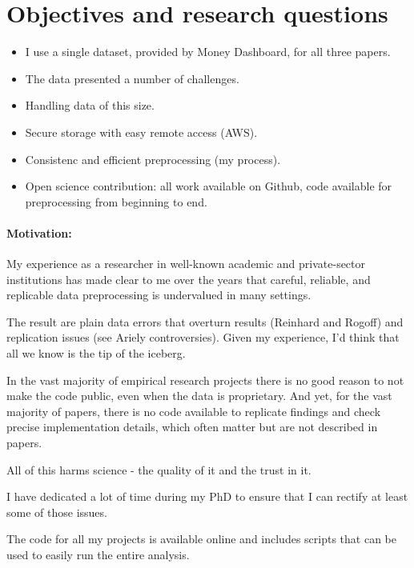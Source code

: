 
\section{Objectives and research questions}%
\label{sec:objectives}


\begin{itemize}
    \item I use a single dataset, provided by Money Dashboard, for all three
        papers.

    \item The data presented a number of challenges.

    \item Handling data of this size.

    \item Secure storage with easy remote access (AWS).

    \item Consistenc and efficient preprocessing (my process).

    \item Open science contribution: all work available on Github, code
        available for preprocessing from beginning to end.
\end{itemize}

\paragraph{Motivation:}%
\label{par:motivation_}

My experience as a researcher in well-known academic and private-sector
institutions has made clear to me over the years that careful, reliable, and
replicable data preprocessing is undervalued in many settings.

The result are plain data errors that overturn results (Reinhard and Rogoff)
and replication issues (see Ariely controversies). Given my experience, I'd
think that all we know is the tip of the iceberg.

In the vast majority of empirical research projects there is no good reason to
not make the code public, even when the data is proprietary. And yet, for the
vast majority of papers, there is no code available to replicate findings and
check precise implementation details, which often matter but are not described
in papers.

All of this harms science - the quality of it and the trust in it.

I have dedicated a lot of time during my PhD to ensure that I can rectify at
least some of those issues.

The code for all my projects is available online and includes scripts that can
be used to easily run the entire analysis.

